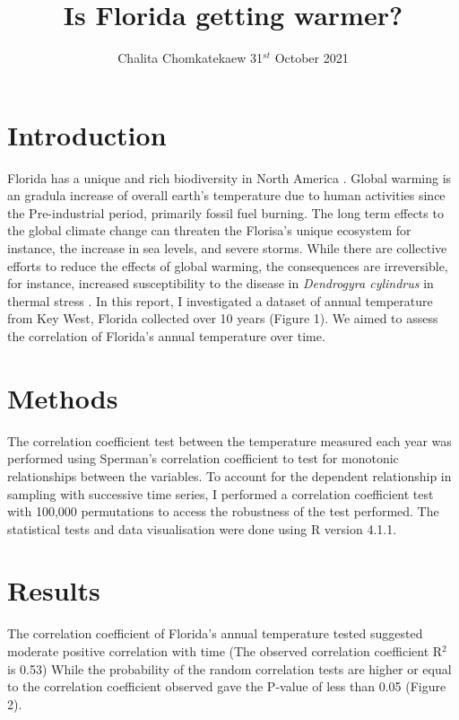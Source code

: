 \documentclass[10pt]{article}
\title{Is Florida getting warmer? \vspace{-0.5em}}
\author{Chalita Chomkatekaew 31$^{st}$ October 2021}
\date{}
\begin{document}
\maketitle

\section{Introduction \vspace{-0.5em}}
        
        Florida has a unique and rich biodiversity in North America \cite{blaustein_biodiversity_2008}. Global warming is an gradula increase of overall earth's temperature due to human activities since the Pre-industrial period, primarily fossil fuel burning. The long term effects to the global climate change can threaten the Florisa's unique ecosystem for instance, the increase in sea levels, and severe storms. While there are collective efforts to reduce the effects of global warming, the consequences are irreversible, for instance, increased susceptibility to the disease in \textit{Dendrogyra cylindrus} in thermal stress \cite{jones_temperature_2021}.  In this report, I investigated a dataset of annual temperature from Key West, Florida collected over 10 years (Figure 1). We aimed to assess the correlation of Florida's annual temperature over time. 
        
\section{Methods \vspace{-0.5em}}

		The correlation coefficient test between the temperature measured each year was performed using Sperman's correlation coefficient to test for monotonic relationships between the variables. To account for the dependent relationship in sampling with successive time series, I performed a correlation coefficient test with 100,000 permutations to access the robustness of the test performed. The statistical tests and data visualisation were done using R version 4.1.1.
		
\section{Results}
     The correlation coefficient of Florida's annual temperature tested suggested moderate positive correlation with time (The observed correlation coefficient R$^{2}$ is 0.53) While the probability of the random correlation tests are higher or equal to the correlation coefficient observed gave the P-value of less than 0.05 (Figure 2). 
           
\end{document}
